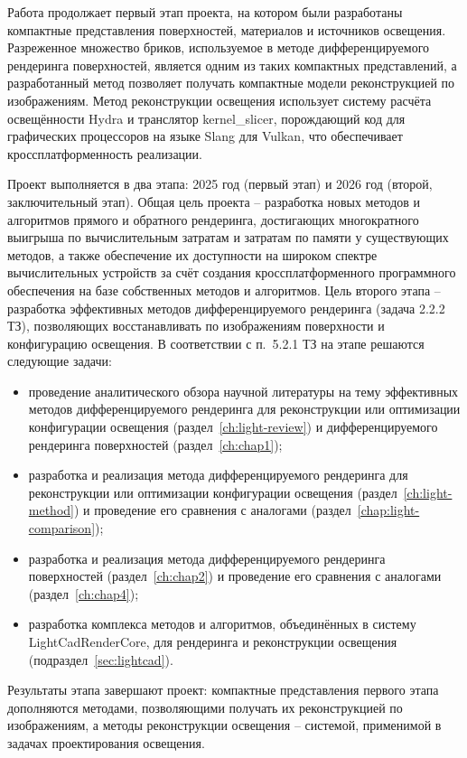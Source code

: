 Работа продолжает первый этап проекта, на котором были разработаны компактные представления поверхностей, материалов и источников освещения. Разреженное множество бриков, используемое в методе дифференцируемого рендеринга поверхностей, является одним из таких компактных представлений, а разработанный метод позволяет получать компактные модели реконструкцией по изображениям. Метод реконструкции освещения использует систему расчёта освещённости Hydra и транслятор kernel\_slicer, порождающий код для графических процессоров на языке Slang для Vulkan, что обеспечивает кроссплатформенность реализации.

Проект выполняется в два этапа: 2025 год (первый этап) и 2026 год (второй, заключительный этап). Общая цель проекта -- разработка новых методов и алгоритмов прямого и обратного рендеринга, достигающих многократного выигрыша по вычислительным затратам и затратам по памяти у существующих методов, а также обеспечение их доступности на широком спектре вычислительных устройств за счёт создания кроссплатформенного программного обеспечения на базе собственных методов и алгоритмов. Цель второго этапа -- разработка эффективных методов дифференцируемого рендеринга (задача 2.2.2 ТЗ), позволяющих восстанавливать по изображениям поверхности и конфигурацию освещения. В соответствии с п.~5.2.1 ТЗ на этапе решаются следующие задачи:
\begin{itemize}
    \item проведение аналитического обзора научной литературы на тему эффективных методов дифференцируемого рендеринга для реконструкции или оптимизации конфигурации освещения (раздел~\ref{ch:light-review}) и дифференцируемого рендеринга поверхностей (раздел~\ref{ch:chap1});
    \item разработка и реализация метода дифференцируемого рендеринга для реконструкции или оптимизации конфигурации освещения (раздел~\ref{ch:light-method}) и проведение его сравнения с аналогами (раздел~\ref{chap:light-comparison});
    \item разработка и реализация метода дифференцируемого рендеринга поверхностей (раздел~\ref{ch:chap2}) и проведение его сравнения с аналогами (раздел~\ref{ch:chap4});
    \item разработка комплекса методов и алгоритмов, объединённых в систему LightCadRenderCore, для рендеринга и реконструкции освещения (подраздел~\ref{sec:lightcad}).
\end{itemize}
Результаты этапа завершают проект: компактные представления первого этапа дополняются методами, позволяющими получать их реконструкцией по изображениям, а методы реконструкции освещения -- системой, применимой в задачах проектирования освещения.

\endinput
